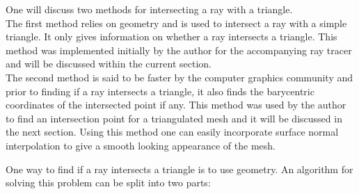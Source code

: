 \documentclass{article}
\begin{document}
\vspace*{3\baselineskip}

One will discuss two methods for intersecting a ray with a triangle. \\
The first method relies on geometry and is used to intersect a ray with a simple triangle. It only gives information on whether a ray intersects a triangle. This method was implemented initially by the author for the accompanying ray tracer and will be discussed within the current section. \\
The second method is said to be faster by the computer graphics community \cite{fast_triangle_isect} and prior to finding if a ray intersects a triangle, it also finds the barycentric coordinates of the intersected point if any. This method was used by the author to find an intersection point for a triangulated mesh and it will be discussed in the next section. Using this method one can easily incorporate surface normal interpolation to give a smooth looking appearance of the mesh.

\vspace*{\baselineskip}

One way to find if a ray intersects a triangle is to use geometry. An algorithm for solving this problem can be split into two parts:
\end{document}
